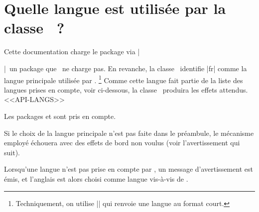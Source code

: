 \documentclass{tutodoc}
\begin{document}
\section{Quelle langue est utilisée par la classe \thisproj\ ?}

Cette documentation charge le package  via \tdoclatexin|\usepackage[french]{babel}|\, un package que \thisproj\ ne charge pas.
En revanche, la classe \thisproj\ identifie \tdoclatexin|fr| comme la langue principale utilisée par .%
\footnote{
    Techniquement, on utilise \tdoclatexin|| qui renvoie une langue au format court.
}
Comme cette langue fait partie de la liste des langues prises en compte, voir ci-dessous, la classe \thisproj\ produira les effets attendus.
<<API-LANGS>>


\begin{tdocnote}
    Les packages  et  sont pris en compte.
\end{tdocnote}


\begin{tdoccaut}
    Si le choix de la langue principale n'est pas faite dans le préambule, le mécanisme employé échouera avec des effets de bord non voulus (voir l'avertissement qui suit).
\end{tdoccaut}


\begin{tdocwarn}
    Lorsqu'une langue n'est pas prise en compte par \thisproj, un message d'avertissement est émis, et l'anglais est alors choisi comme langue vis-à-vis de \thisproj.
\end{tdocwarn}
\end{document}
